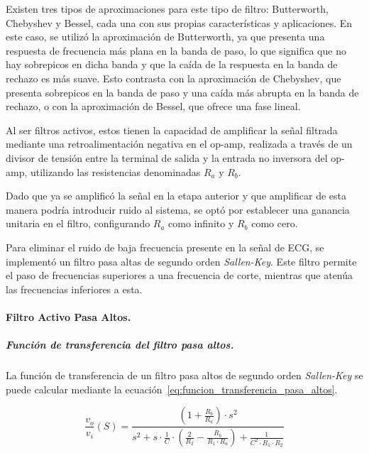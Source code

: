             Existen tres tipos de aproximaciones para este tipo de filtro: Butterworth, Chebyshev y Bessel, cada una con sus propias características y aplicaciones. En este caso, se utilizó la aproximación de Butterworth, ya que presenta una respuesta de frecuencia más plana en la banda de paso, lo que significa que no hay sobrepicos en dicha banda y que la caída de la respuesta en la banda de rechazo es más suave. Esto contrasta con la aproximación de Chebyshev, que presenta sobrepicos en la banda de paso y una caída más abrupta en la banda de rechazo, o con la aproximación de Bessel, que ofrece una fase lineal.

            Al ser filtros activos, estos tienen la capacidad de amplificar la señal filtrada mediante una retroalimentación negativa en el op-amp, realizada a través de un divisor de tensión entre la terminal de salida y la entrada no inversora del op-amp, utilizando las resistencias denominadas $R_a$ y $R_b$.

            Dado que ya se amplificó la señal en la etapa anterior y que amplificar de esta manera podría introducir ruido al sistema, se optó por establecer una ganancia unitaria en el filtro, configurando $R_a$ como infinito y $R_b$ como cero.

            Para eliminar el ruido de baja frecuencia presente en la señal de ECG, se implementó un filtro pasa altas de segundo orden \textit{Sallen-Key}. Este filtro permite el paso de frecuencias superiores a una frecuencia de corte, mientras que atenúa las frecuencias inferiores a esta.

            \paragraph{Filtro Activo Pasa Altos.}
                \subparagraph{Función de transferencia del filtro pasa altos.}
                    La función de transferencia de un filtro pasa altos de segundo orden \textit{Sallen-Key} se puede calcular mediante la ecuación~\ref{eq:funcion_transferencia_pasa_altos}.

                    \begin{equation}
                        \label{eq:funcion_transferencia_pasa_altos}
                        \frac{v_o}{v_i}(S) = \frac{(1+\frac{R_b}{R_a}) \cdot s^2}{s^2 + s \cdot \frac{1}{C} \cdot (\frac{2}{R_2}- \frac{R_b}{R_1 \cdot R_a}) + \frac{1}{C^2 \cdot R_1 \cdot R_2}}
                    \end{equation}

